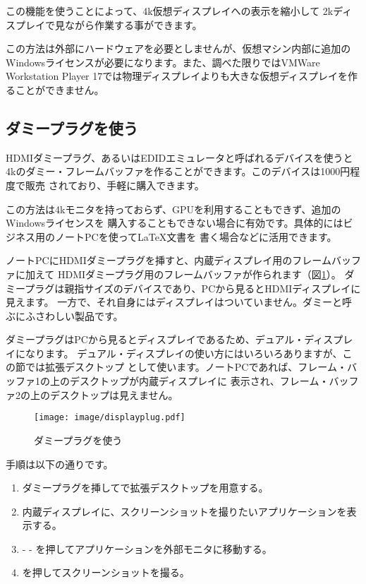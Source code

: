 この機能を使うことによって、4k仮想ディスプレイへの表示を縮小して
2kディスプレイで見ながら作業する事ができます。

この方法は外部にハードウェアを必要としませんが、仮想マシン内部に追加の
Windowsライセンスが必要になります。また、調べた限りではVMWare Workstation
Player 17では物理ディスプレイよりも大きな仮想ディスプレイを作ることができません。


\subsection{ダミープラグを使う}
HDMIダミープラグ、あるいはEDIDエミュレータと呼ばれるデバイスを使うと
4kのダミー・フレームバッファを作ることができます。このデバイスは1000円程度で販売
されており、手軽に購入できます。

この方法は4kモニタを持っておらず、GPUを利用することもできず、追加のWindowsライセンスを
購入することもできない場合に有効です。具体的にはビジネス用のノートPCを使って\LaTeX 文書を
書く場合などに活用できます。

ノートPCにHDMIダミープラグを挿すと、内蔵ディスプレイ用のフレームバッファに加えて
HDMIダミープラグ用のフレームバッファが作られます（図\ref{fig:display-plug}）。
ダミープラグは親指サイズのデバイスであり、PCから見るとHDMIディスプレイに見えます。
一方で、それ自身にはディスプレイはついていません。ダミーと呼ぶにふさわしい製品です。

ダミープラグはPCから見るとディスプレイであるため、デュアル・ディスプレイになります。
デュアル・ディスプレイの使い方にはいろいろありますが、この節では拡張デスクトップ
として使います。ノートPCであれば、フレーム・バッファ1の上のデスクトップが内蔵ディスプレイに
表示され、フレーム・バッファ2の上のデスクトップは見えません。


\begin{figure}[btp]
  \begin{center}
    \texttt{[image: image/displayplug.pdf]}
    \caption{ダミープラグを使う} \label{fig:display-plug}
  \end{center}
\end{figure}



手順は以下の通りです。

\begin{enumerate}
  \item ダミープラグを挿してで拡張デスクトップを用意する。
  \item 内蔵ディスプレイに、スクリーンショットを撮りたいアプリケーションを表示する。
  \item {} -  - を押してアプリケーションを外部モニタに移動する。
  \item {}を押してスクリーンショットを撮る。
\end{enumerate}

